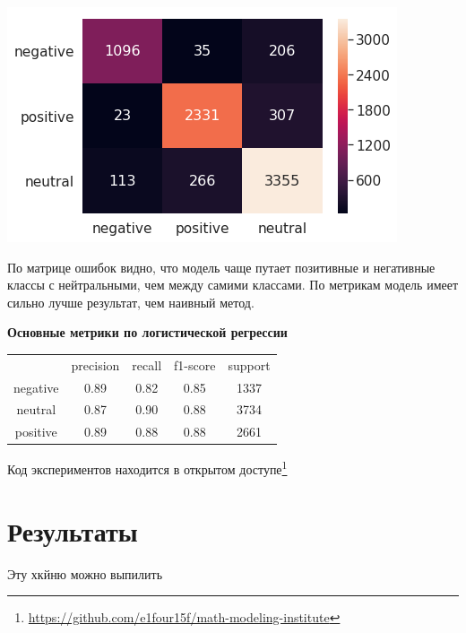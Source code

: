 \documentclass[12pt]{article}
\begin{document}
        \begin{center}
            \includegraphics[scale=0.8]{logreg_heat}
        \end{center}

        По матрице ошибок видно, что модель чаще путает позитивные и негативные классы с нейтральными, 
        чем между самими классами. По метрикам модель имеет сильно лучше результат, чем наивный метод.
        
        \textbf{Основные метрики по логистической регрессии}
        \begin{center}
            \begin{tabular}{ c c c c c}
             & precision & recall & f1-score & support\\ 
             negative & 0.89 & 0.82 & 0.85 & 1337\\ 
             neutral & 0.87 & 0.90 & 0.88 & 3734\\
             positive & 0.89 & 0.88 & 0.88 & 2661
            \end{tabular}
        \end{center}

        Код экспериментов находится в открытом доступе\footnote{\href{https://github.com/e1four15f/math-modeling-institute}{https://github.com/e1four15f/math-modeling-institute}}

    \section{Результаты}
        Эту хкйню можно выпилить 
\end{document}

